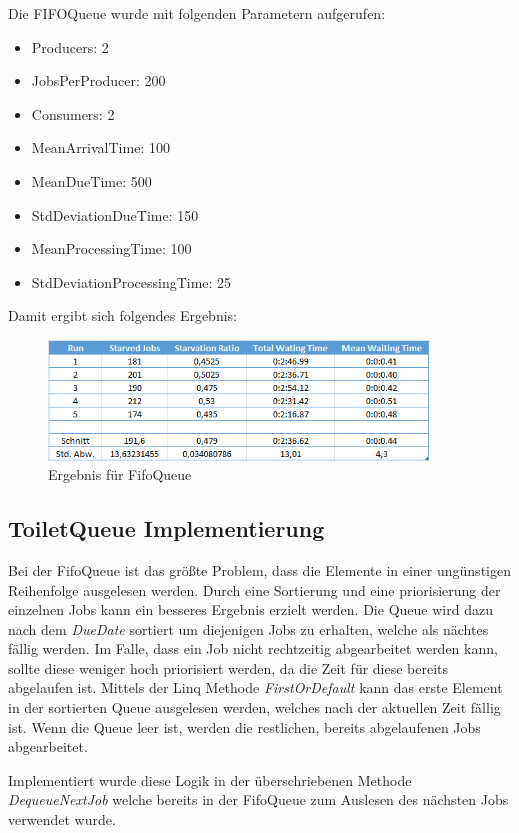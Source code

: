 \documentclass[a4paper,ngerman]{scrartcl}
\begin{document}
Die FIFOQueue wurde mit folgenden Parametern aufgerufen:

\begin{itemize}
	\item Producers: 2
	\item JobsPerProducer: 200
	\item Consumers: 2
	\item MeanArrivalTime: 100
	\item MeanDueTime: 500
	\item StdDeviationDueTime: 150
	\item MeanProcessingTime: 100
	\item StdDeviationProcessingTime: 25
\end{itemize}

Damit ergibt sich folgendes Ergebnis:

\begin{figure}[h]
	\centering
		\includegraphics[width=0.9\textwidth]{images/FifoResult.PNG}
	\caption{Ergebnis für FifoQueue}
	\label{fig:FifoQueueResult}
\end{figure}

\subsection{ToiletQueue Implementierung}
Bei der FifoQueue ist das größte Problem, dass die Elemente in einer ungünstigen Reihenfolge ausgelesen werden. Durch eine Sortierung
und eine priorisierung der einzelnen Jobs kann ein besseres Ergebnis erzielt werden. Die Queue wird dazu nach dem \textit{DueDate}
sortiert um diejenigen Jobs zu erhalten, welche als nächtes fällig werden. Im Falle, dass ein Job nicht rechtzeitig abgearbeitet werden 
kann, sollte diese weniger hoch priorisiert werden, da die Zeit für diese bereits abgelaufen ist. Mittels der Linq Methode \textit{FirstOrDefault}
kann das erste Element in der sortierten Queue ausgelesen werden, welches nach der aktuellen Zeit fällig ist. Wenn die Queue leer ist, werden die
restlichen, bereits abgelaufenen Jobs abgearbeitet.

Implementiert wurde diese Logik in der überschriebenen Methode \textit{DequeueNextJob} welche bereits in der FifoQueue zum Auslesen des nächsten
Jobs verwendet wurde.
\end{document}
